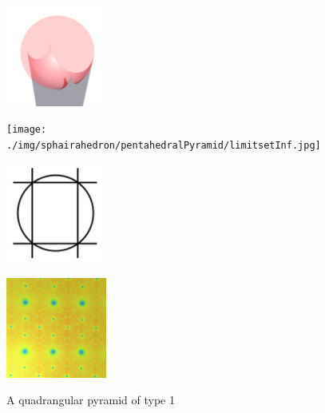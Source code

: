 \documentclass[suppldata, dvipdfmx]{interact}
\theoremstyle{plain}%
\theoremstyle{definition}
\theoremstyle{remark}
\theoremstyle{problemstyle}
\begin{document}
\begin{figure}[h!tbp]
  \begin{minipage}[t]{0.23\textwidth}
   \centering \includegraphics[width=1.3in,
   keepaspectratio]{./img/sphairahedron/pentahedralPyramid/sphairahedronInf.jpg}
   \subcaption{} 
   \label{fig:pentahedralPyramidInf}
  \end{minipage}
  \hspace*{\fill}
  \begin{minipage}[t]{0.23\textwidth}
   \centering
   \texttt{[image: ./img/sphairahedron/pentahedralPyramid/limitsetInf.jpg]}
   \subcaption{}
   \label{fig:pentahedralPyramidLimitset}
  \end{minipage}
 \hspace*{\fill}
  \begin{minipage}[t]{0.23\textwidth}
   \centering
   \includegraphics[width=1.3in, keepaspectratio]{./img/HexahedraWithSphericalFaces/pentahedralPyramid/slice_a.jpg}
   \subcaption{}
   \label{fig:pentahedralPyramidSlice}
  \end{minipage}
 \hspace*{\fill}
  \begin{minipage}[t]{0.23\textwidth}
   \centering
   \includegraphics[width=1.3in, keepaspectratio]{./img/sphairahedron/pentahedralPyramid/limitsetAbove_a.jpg}
   \subcaption{}
   \label{fig:pentahedralPyramidAbove}
  \end{minipage}
 \hspace*{\fill}
 \caption{A quadrangular pyramid of type 1}
 \label{fig:quadrangularPyramid_Inf_1}
\end{figure}
\end{document}
